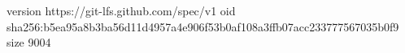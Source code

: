 version https://git-lfs.github.com/spec/v1
oid sha256:b5ea95a8b3ba56d11d4957a4e906f53b0af108a3ffb07acc233777567035b0f9
size 9004
